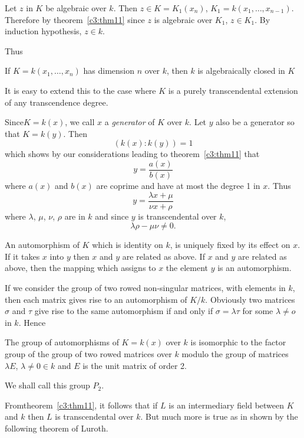 Let $z$ in $K$ be algebraic over $k$. Then $z \in K =
K_1(x_n)$, $K_1=k(x_1, \ldots,x_{n-1})$. Therefore by 
theorem~\ref{c3:thm11} since 
$z$ is algebraic over $K_1$, $z \in K_1$. By induction hypothesis, $z
\in k$.  

Thus 

\begin{coro*}
 If $K=k(x_1, \ldots,x_n)$ has dimension $n$ over $k$, then $k$ is
  algebraically closed in $K$ 
\end{coro*}

It is easy to extend this to the case where $K$ is a purely
transcendental extension of any transcendence degree. 

Since\pageoriginale $ K = k (x) $, we call $x$ a \textit{generator} of
$K$ over $k$. Let $y$ also be a generator so that $ K = k (y) $. Then   
$$
(k (x) : k (y) ) =1
$$
which shows by our considerations leading to theorem~\ref{c3:thm11} 
that  
$$
y = \frac{a(x)}{b(x)}
$$
where $a(x)$ and $b(x)$ are coprime and have at most the degree
1 in $x$. Thus 
$$
y = \frac{\lambda x+ \mu}{\nu x + \rho}
$$
where $ \lambda$, $\mu$, $\nu$, $\rho$ are in $k$ and since $y$ is
transcendental over $k$, 
$$
\lambda \rho - \mu \nu \neq 0 .
$$

An automorphism of $K$  which is identity on  $k$, is uniquely fixed
by its  effect on $x$. If it takes $x$  into $y$ then $x$ and $y$ are
related as above. If $x$ and $y$  are related as above, then the
mapping which assigns to $x$ the element $y$ is an automorphism.  

If we consider the group of two rowed non-singular matrices, with
elements in $k$, then each matrix gives rise to an automorphism of $
K/k $. Obviously two matrices $ \sigma $ and $ \tau $ give rise to
the same automorphism if and only if $ \sigma = \lambda \tau $ for
some $ \lambda \neq o $ in $k$. Hence 

\begin{thm}\label{c3:thm12}%
 The group of automorphisms of $K = k (x) $ over $ k $ is
  isomorphic to  the factor group of the group of two  rowed matrices
  over $k$ modulo the group of matrices  $ \lambda E$, $\lambda \neq 0
  \in k $ and $E$ is  the unit matrix of order 2. 
\end{thm}

We shall call this group $ P_2 $.

From\pageoriginale theorem~\ref{c3:thm11}, it follows that if $L$ is an
intermediary field between $K$ and $k$ then $L$ is transcendental over
$k$. But much more is true as in shown by the following theorem of
Luroth.  

